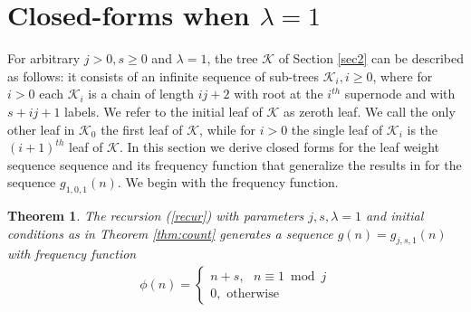 \documentclass[12pt]{amsart}
\newtheorem{theorem}{Theorem}[section]
\numberwithin{equation}{section}
\numberwithin{theorem}{section}
\numberwithin{table}{section}
\numberwithin{figure}{section}
\begin{document}
\iffalse
on Figure \ref{fig4}. This construction and proofs similar to the ones given in Section \ref{sec2} hold in general and we obtain alternative combinatorial interpretation of the recursion (\ref{recur}).

It is possible use recursion \ref{recur} to generate sequences that also have completely different members. For instance, $g(n)$ with $j=2$,$\lambda=3$ and $s=4$ and initial conditions $g(1)=\ldots=g(3)=1$, $g(4)=\ldots=g(7)=6$ and $g(8)=\ldots=g(14)=10$ generates a sequence $1,1,1,6,6,6,6,10,10,10,10,10,10,10,7,7,7,12,16,16,12,7,7,16,16,13,12\ldots$. Not only this sequence contains even numbers (unlike all the other examples we have seen so far for this parameter set), but it is also non monotone.	

\fi

\section{Closed-forms when $\lambda = 1$} \label{sec4}

For arbitrary $j>0, s\geq 0$ and $\lambda=1$, the tree ${\mathcal K}$ of Section \ref{sec2} can be described as follows: it consists of an infinite sequence of sub-trees ${\mathcal K}_i, i \geq 0$, where for $i>0$ each ${\mathcal K}_i$ is a chain of length $ij+2$ with root at the $i^{th}$ supernode and with $s+ij+1$ labels. We refer to the initial leaf of ${\mathcal K}$ as zeroth leaf. We call the only other leaf in ${\mathcal K}_0$ the first leaf of ${\mathcal K}$, while for $i>0$ the single leaf of ${\mathcal K}_i$ is the $(i+1)^{th}$ leaf of ${\mathcal K}$. In this section we derive closed forms for the leaf weight sequence sequence and its frequency function that generalize the results in \cite{Golomb1990} for the sequence $g_{1,0,1}(n)$. We begin with the frequency function.

\begin{theorem}
The recursion (\ref{recur}) with parameters $j,s,\lambda=1$ and initial conditions as in Theorem \ref{thm:count} generates a sequence $g(n)=g_{j,s,1}(n)$ with frequency function
\begin{align*}
\phi(n) =
\begin{cases}
n+s, \text{  } n \equiv 1 \bmod{j} \\
0, \text{  otherwise}
\end{cases}
\end{align*}
\label{thm:freq}
\end{theorem}
\end{document}
